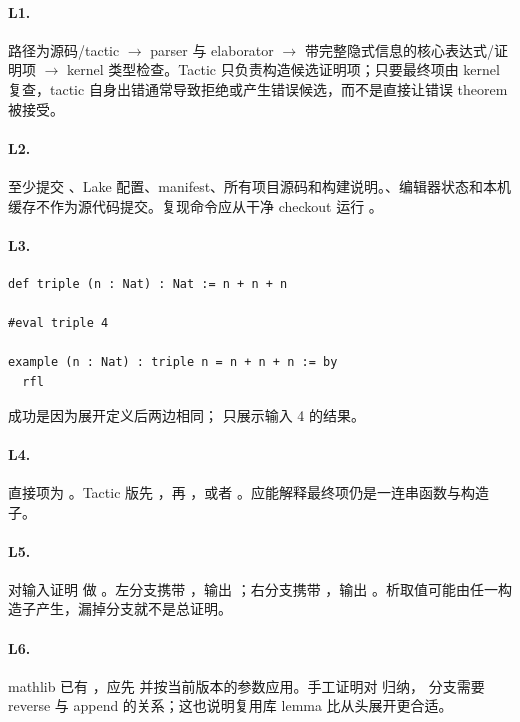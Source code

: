 \paragraph{L1.}
路径为源码/tactic $\to$ parser 与 elaborator $\to$ 带完整隐式信息的核心表达式/证明项 $\to$ kernel 类型检查。Tactic 只负责构造候选证明项；只要最终项由 kernel 复查，tactic 自身出错通常导致拒绝或产生错误候选，而不是直接让错误 theorem 被接受。

\paragraph{L2.}
至少提交 、Lake 配置、manifest、所有项目源码和构建说明。、编辑器状态和本机缓存不作为源代码提交。复现命令应从干净 checkout 运行 。

\paragraph{L3.}
\begin{lstlisting}
def triple (n : Nat) : Nat := n + n + n

#eval triple 4

example (n : Nat) : triple n = n + n + n := by
  rfl
\end{lstlisting}
 成功是因为展开定义后两边相同； 只展示输入 4 的结果。

\paragraph{L4.}
直接项为 。Tactic 版先 ，再 ，或者 。应能解释最终项仍是一连串函数与构造子。

\paragraph{L5.}
对输入证明  做 。左分支携带 ，输出 ；右分支携带 ，输出 。析取值可能由任一构造子产生，漏掉分支就不是总证明。

\paragraph{L6.}
mathlib 已有 ，应先  并按当前版本的参数应用。手工证明对  归纳， 分支需要 reverse 与 append 的关系；这也说明复用库 lemma 比从头展开更合适。

